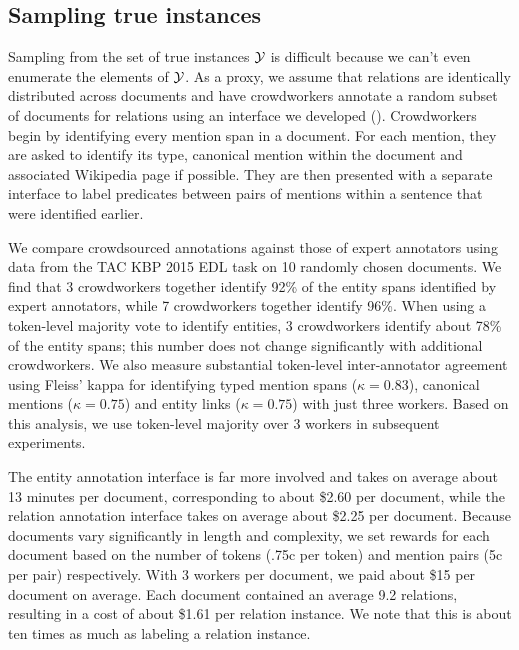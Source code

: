 \subsection{Sampling true instances}
Sampling from the set of true instances $\mathcal{Y}$ is difficult because we can't even enumerate the elements of $\mathcal{Y}$.
As a proxy, we assume that relations are identically distributed across documents and have crowdworkers annotate a random subset of documents for relations using an interface we developed ().
Crowdworkers begin by identifying every mention span in a document.
  For each mention, they are asked to identify its type, canonical mention within the document
  and associated Wikipedia page if possible.
They are then presented with a separate interface to label predicates between pairs of mentions within a sentence that were identified earlier.

We compare crowdsourced annotations against those of expert annotators using data from the TAC KBP 2015 EDL task on 10 randomly chosen documents.
We find that 3 crowdworkers together identify 92\% of the entity spans identified by expert annotators, while 7 crowdworkers together identify 96\%.
When using a token-level majority vote to identify entities, 3 crowdworkers identify about 78\% of the entity spans; this number does not change significantly with additional crowdworkers.
We also measure substantial token-level inter-annotator agreement using Fleiss' kappa for identifying typed mention spans ($\kappa = 0.83$), canonical mentions ($\kappa = 0.75$) and entity links ($\kappa = 0.75$) with just three workers.
Based on this analysis, we use token-level majority over 3 workers in subsequent experiments.

The entity annotation interface is far more involved and takes on average about 13 minutes per document, corresponding to about \$2.60 per document, while the relation annotation interface takes on average about \$2.25 per document.
Because documents vary significantly in length and complexity, we set rewards for each document based on the number of tokens (.75c per token) and mention pairs (5c per pair) respectively.
With 3 workers per document, we paid about \$15 per document on average.
Each document contained an average 9.2 relations, resulting in a cost of about \$1.61 per relation instance.
We note that this is about ten times as much as labeling a relation instance.

